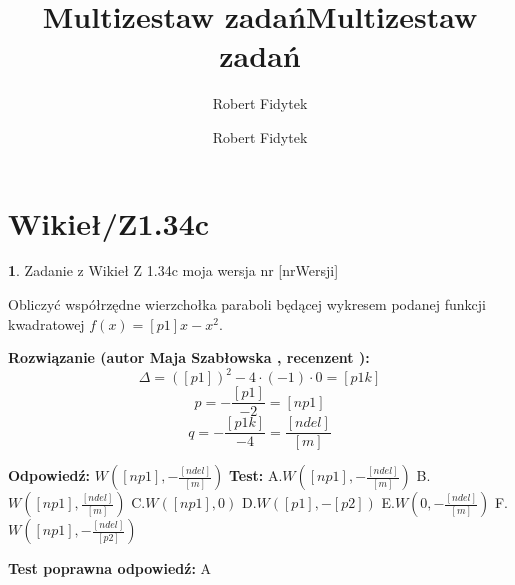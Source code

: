 \documentclass[12pt, a4paper]{article}
\title{Multizestaw zadań}
\author{Robert Fidytek}
\date{}\documentclass[12pt, a4paper]{article}
\title{Multizestaw zadań}
\author{Robert Fidytek}
\date{}
\theoremstyle{definition} %
\newtheorem{zad}{}
\theoremstyle{definition} %
\newtheorem{zad}{}
\newcommand{\kategoria}[1]{\section{#1}} %
\newcommand{\zadStart}[1]{\begin{zad}#1\newline} %
\newcommand{\zadStop}{\end{zad}}   %
\newcommand{\rozwStart}[2]{\noindent \textbf{Rozwiązanie (autor #1 , recenzent #2): }\newline} %
\newcommand{\rozwStop}{\newline}                                            %
\newcommand{\odpStart}{\noindent \textbf{Odpowiedź:}\newline}    %
\newcommand{\odpStop}{\newline}                                             %
\newcommand{\testStart}{\noindent \textbf{Test:}\newline} %
\newcommand{\testStop}{\newline} %
\newcommand{\kluczStart}{\noindent \textbf{Test poprawna odpowiedź:}\newline} %
\newcommand{\kluczStop}{\newline} %
\begin{document}
\maketitle


\kategoria{Wikieł/Z1.34c}
\zadStart{Zadanie z Wikieł Z 1.34c moja wersja nr [nrWersji]}


Obliczyć współrzędne wierzchołka paraboli będącej wykresem podanej funkcji kwadratowej $f(x)=[p1]x-x^{2}.$
\zadStop

\rozwStart{Maja Szabłowska}{}
$$\Delta=([p1])^{2}-4\cdot(-1)\cdot0=[p1k]$$
$$p=-\frac{[p1]}{-2}=[np1]$$
$$q=-\frac{[p1k]}{-4}=\frac{[ndel]}{[m]}$$


\rozwStop


\odpStart
$W([np1],-\frac{[ndel]}{[m]})$
\odpStop
\testStart
A.$W([np1],-\frac{[ndel]}{[m]})$
B.$W([np1],\frac{[ndel]}{[m]})$
C.$W([np1],0)$
D.$W([p1],-[p2])$
E.$W(0,-\frac{[ndel]}{[m]})$
F.$W([np1],-\frac{[ndel]}{[p2]})$


\testStop
\kluczStart
A
\kluczStop
\end{document}
